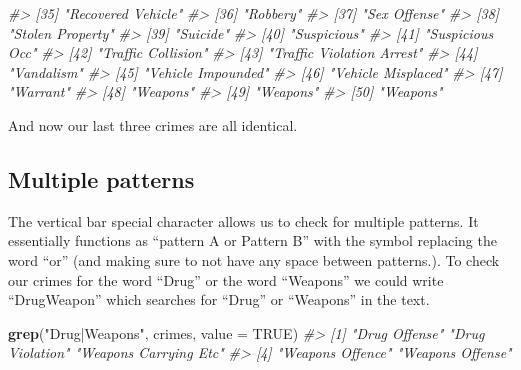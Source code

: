 \documentclass[
  12pt,
]{book}
\newenvironment{Shaded}{\begin{snugshade}}{\end{snugshade}}
\newcommand{\CommentTok}[1]{\textcolor[rgb]{0.56,0.35,0.01}{\textit{#1}}}
\newcommand{\DataTypeTok}[1]{\textcolor[rgb]{0.13,0.29,0.53}{#1}}
\newcommand{\KeywordTok}[1]{\textcolor[rgb]{0.13,0.29,0.53}{\textbf{#1}}}
\newcommand{\NormalTok}[1]{#1}
\newcommand{\OtherTok}[1]{\textcolor[rgb]{0.56,0.35,0.01}{#1}}
\newcommand{\StringTok}[1]{\textcolor[rgb]{0.31,0.60,0.02}{#1}}
\begin{document}
\begin{Shaded}
\begin{Highlighting}[]
\CommentTok{\#> [35] "Recovered Vehicle"                         }
\CommentTok{\#> [36] "Robbery"                                   }
\CommentTok{\#> [37] "Sex Offense"                               }
\CommentTok{\#> [38] "Stolen Property"                           }
\CommentTok{\#> [39] "Suicide"                                   }
\CommentTok{\#> [40] "Suspicious"                                }
\CommentTok{\#> [41] "Suspicious Occ"                            }
\CommentTok{\#> [42] "Traffic Collision"                         }
\CommentTok{\#> [43] "Traffic Violation Arrest"                  }
\CommentTok{\#> [44] "Vandalism"                                 }
\CommentTok{\#> [45] "Vehicle Impounded"                         }
\CommentTok{\#> [46] "Vehicle Misplaced"                         }
\CommentTok{\#> [47] "Warrant"                                   }
\CommentTok{\#> [48] "Weapons"                                   }
\CommentTok{\#> [49] "Weapons"                                   }
\CommentTok{\#> [50] "Weapons"}
\end{Highlighting}
\end{Shaded}

And now our last three crimes are all identical.

\hypertarget{multiple-patterns}{%
\subsection{\texorpdfstring{Multiple patterns \texttt{\textbar{}}}{Multiple patterns \textbar{}}}\label{multiple-patterns}}

The vertical bar \texttt{\textbar{}} special character allows us to check for multiple patterns. It essentially functions as ``pattern A or Pattern B'' with the \texttt{\textbar{}} symbol replacing the word ``or'' (and making sure to not have any space between patterns.). To check our crimes for the word ``Drug'' or the word ``Weapons'' we could write ``Drug\textbar Weapon'' which searches for ``Drug'' or ``Weapons'' in the text.

\begin{Shaded}
\begin{Highlighting}[]
\KeywordTok{grep}\NormalTok{(}\StringTok{"Drug|Weapons"}\NormalTok{, crimes, }\DataTypeTok{value =} \OtherTok{TRUE}\NormalTok{)}
\CommentTok{\#> [1] "Drug Offense"         "Drug Violation"       "Weapons Carrying Etc"}
\CommentTok{\#> [4] "Weapons Offence"      "Weapons Offense"}
\end{Highlighting}
\end{Shaded}
\end{document}
